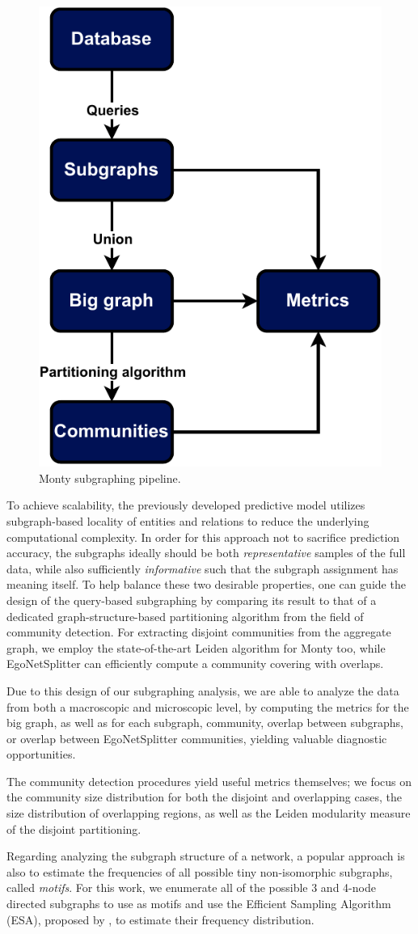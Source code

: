 \begin{figure}[H]
\centering
\includegraphics[width=0.35\columnwidth]{figures/swisscom/subgraphing.pdf}
\caption[Monty subgraphing pipeline.]{Monty subgraphing pipeline.}
\label{fig:subgraphing}
\end{figure}

To achieve scalability, the previously developed predictive model utilizes subgraph-based locality of entities and relations to reduce the underlying computational complexity. In order for this approach not to sacrifice prediction accuracy, the subgraphs ideally should be both \emph{representative} samples of the full data, while also sufficiently \emph{informative} such that the subgraph assignment has meaning itself. To help balance these two desirable properties, one can guide the design of the query-based subgraphing by comparing its result to that of a dedicated graph-structure-based partitioning algorithm from the field of community detection. For extracting disjoint communities from the aggregate graph, we employ the state-of-the-art Leiden algorithm \cite{traag_louvain_2019} for Monty too, while EgoNetSplitter \cite{epasto_ego-splitting_2017} can efficiently compute a community covering with overlaps.

Due to this design of our subgraphing analysis, we are able to analyze the data from both a macroscopic and microscopic level, by computing the metrics for the big graph, as well as for each subgraph, community, overlap between subgraphs, or overlap between EgoNetSplitter communities, yielding valuable diagnostic opportunities.

The community detection procedures yield useful metrics themselves; we focus on the community size distribution for both the disjoint and overlapping cases, the size distribution of overlapping regions, as well as the Leiden modularity measure of the disjoint partitioning.

Regarding analyzing the subgraph structure of a network, a popular approach is also to estimate the frequencies of all possible tiny non-isomorphic subgraphs, called \emph{motifs}. For this work, we enumerate all of the possible 3 and 4-node directed subgraphs to use as motifs and use the Efficient Sampling Algorithm (ESA), proposed by \cite{kashtan_efficient_2004}, to estimate their frequency distribution.  

